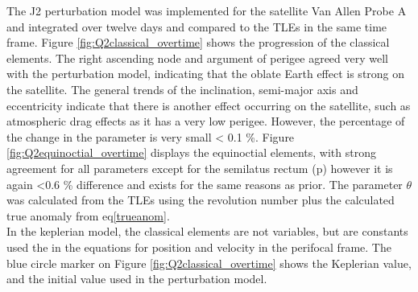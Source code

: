 \documentclass[Space3_Assign1.tex]{subfiles}
\begin{document}
The J2 perturbation model was implemented for the satellite Van Allen Probe A and integrated over twelve days and compared to the TLEs in the same time frame. Figure \ref{fig:Q2classical_overtime} shows the progression of the classical elements. The right ascending node and argument of perigee agreed very well with the perturbation model, indicating that the oblate Earth effect is strong on the satellite. The general trends of the inclination, semi-major axis and eccentricity indicate that there is another effect occurring on the satellite, such as atmospheric drag effects as it has a very low perigee. However, the percentage of the change in the parameter is very small < 0.1 \%. Figure \ref{fig:Q2equinoctial_overtime} displays the equinoctial elements, with strong agreement for all parameters except for the semilatus rectum (p) however it is again <0.6 \% difference and exists for the same reasons as prior. The parameter $\theta$ was calculated from the TLEs using the revolution number plus the calculated true anomaly from eq\eqref{trueanom}. \\\indent
In the keplerian model, the classical elements are not variables, but are constants used the in the equations for position and velocity in the perifocal frame. The blue circle marker on Figure \ref{fig:Q2classical_overtime} shows the Keplerian value, and the initial value used in the perturbation model.
\end{document}
